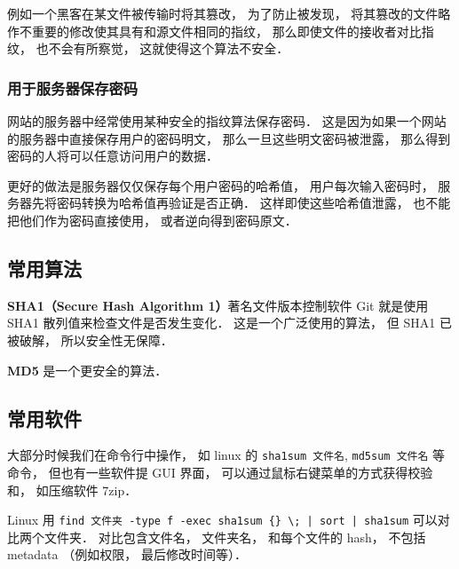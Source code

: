 例如一个黑客在某文件被传输时将其篡改， 为了防止被发现， 将其篡改的文件略作不重要的修改使其具有和源文件相同的指纹， 那么即使文件的接收者对比指纹， 也不会有所察觉， 这就使得这个算法不安全．

\subsubsection{用于服务器保存密码}
网站的服务器中经常使用某种安全的指纹算法保存密码． 这是因为如果一个网站的服务器中直接保存用户的密码明文， 那么一旦这些明文密码被泄露， 那么得到密码的人将可以任意访问用户的数据．

更好的做法是服务器仅仅保存每个用户密码的哈希值， 用户每次输入密码时， 服务器先将密码转换为哈希值再验证是否正确． 这样即使这些哈希值泄露， 也不能把他们作为密码直接使用， 或者逆向得到密码原文．

\subsection{常用算法}
\textbf{SHA1（Secure Hash Algorithm 1）}著名文件版本控制软件 Git %
就是使用 SHA1 散列值来检查文件是否发生变化． 这是一个广泛使用的算法， 但 SHA1 已被破解， 所以安全性无保障．

\textbf{MD5} 是一个更安全的算法．

\subsection{常用软件}
大部分时候我们在命令行中操作， 如 linux 的 \verb|sha1sum 文件名|, \verb|md5sum 文件名| 等命令， 但也有一些软件提 GUI 界面， 可以通过鼠标右键菜单的方式获得校验和， 如压缩软件 7zip．

Linux 用 \verb`find 文件夹 -type f -exec sha1sum {} \; | sort | sha1sum` 可以对比两个文件夹． 对比包含文件名， 文件夹名， 和每个文件的 hash， 不包括 metadata （例如权限， 最后修改时间等）．

